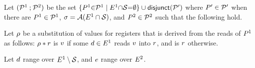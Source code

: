 \begin{definition}
  

  Let $(\mathcal{P}^1 \mathbin; \mathcal{P}^2)$ be the set
  $\{P^1{\in}\mathcal{P}^1\mid E^1{\cap}\mathcal{S}{=}\emptyset\}\cup \mathsf{disjunct}(\mathcal{P}')$
  where $P'\in\mathcal{P}'$ when there are $P^1 \in \mathcal{P}^1$,
  $\sigma=\mathcal{A}(E^1\cap\mathcal{S})$, 
  and $P^2\in\mathcal{P}^2$
  such that the following hold.

Let $\rho$ be a substitution of values for registers that is derived
from the reads of $P^1$ as follows: $\rho\mathbin{\ast}r$ is $v$
if some $d\in E^1$ reads $v$ into $r$, and is $r$ otherwise.

Let $d$ range over $E^1\setminus\mathcal{S}$, and $e$ range over $E^2$.  



\end{definition}
